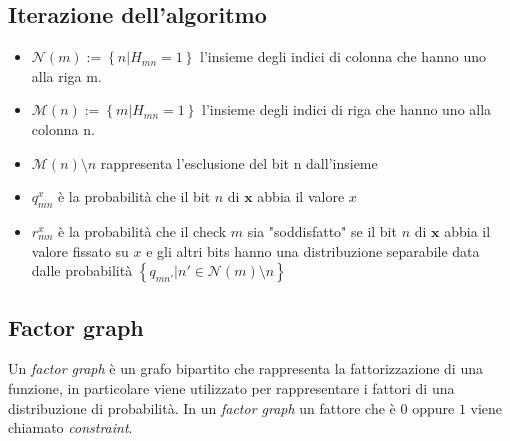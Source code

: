 \documentclass{article}
\begin{document}
	\subsection{Iterazione dell'algoritmo}
	\begin{itemize}
		\item $\mathcal{N}(m) := \left\{ n | H_{mn} = 1 \right\}$ l'insieme degli indici di colonna che hanno uno alla riga m.
		\item $\mathcal{M}(n) := \left\{ m | H_{mn} = 1 \right\}$ l'insieme degli indici di riga che hanno uno alla colonna n.
		\item $\mathcal{M}(n)\setminus n$ rappresenta l'esclusione del bit n dall'insieme
		\item $q^x_{mn}$ è la probabilità che il bit $n$ di $\textbf{x}$ abbia il valore $x$
		\item $r^x_{mn}$ è la probabilità che il check $m$ sia "soddisfatto" se il bit $n$ di $\textbf{x}$ abbia il valore fissato su $x$ e gli altri bits hanno una distribuzione separabile data dalle probabilità $\left\{ q_{mn'} | n' \in \mathcal{N}(m)\setminus n\right\}$
	\end{itemize}
	\subsection{Factor graph}
	Un \textit{factor graph} è un grafo bipartito che rappresenta la fattorizzazione di una funzione, in particolare viene utilizzato per rappresentare i fattori di una distribuzione di probabilità. In un \textit{factor graph} un fattore che è $0$ oppure $1$ viene chiamato \textit{constraint}.
\end{document}

